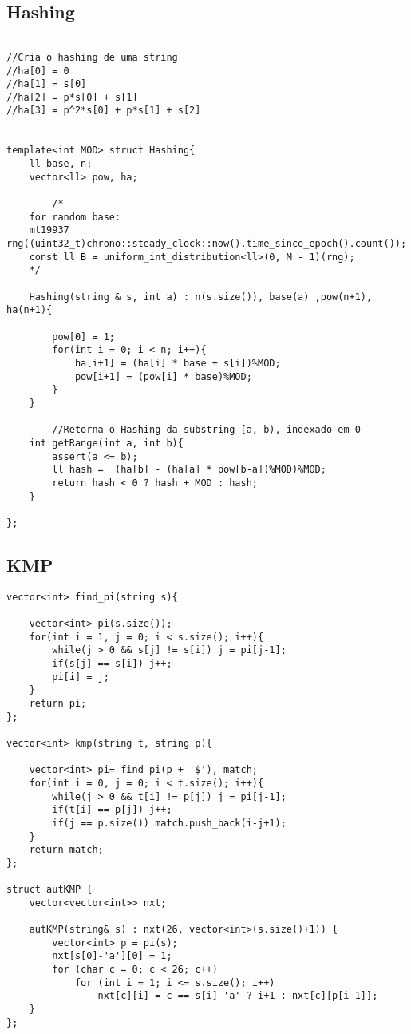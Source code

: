 \documentclass[11pt, a4paper, twoside]{article}
\begin{document}
\subsection{Hashing}
\begin{verbatim}

//Cria o hashing de uma string
//ha[0] = 0
//ha[1] = s[0]
//ha[2] = p*s[0] + s[1]
//ha[3] = p^2*s[0] + p*s[1] + s[2]


template<int MOD> struct Hashing{
    ll base, n;
    vector<ll> pow, ha; 
    
        /*
    for random base:
    mt19937 rng((uint32_t)chrono::steady_clock::now().time_since_epoch().count());
    const ll B = uniform_int_distribution<ll>(0, M - 1)(rng);
    */
    
    Hashing(string & s, int a) : n(s.size()), base(a) ,pow(n+1), ha(n+1){
    
        pow[0] = 1;
        for(int i = 0; i < n; i++){
            ha[i+1] = (ha[i] * base + s[i])%MOD;
            pow[i+1] = (pow[i] * base)%MOD;
        }
    }
        
        //Retorna o Hashing da substring [a, b), indexado em 0
    int getRange(int a, int b){
        assert(a <= b);
        ll hash =  (ha[b] - (ha[a] * pow[b-a])%MOD)%MOD;
        return hash < 0 ? hash + MOD : hash;
    }
        
};
\end{verbatim}

\subsection{KMP}
\begin{verbatim}
vector<int> find_pi(string s){
    
    vector<int> pi(s.size());
    for(int i = 1, j = 0; i < s.size(); i++){
        while(j > 0 && s[j] != s[i]) j = pi[j-1];
        if(s[j] == s[i]) j++;
        pi[i] = j;
    }
    return pi;
};

vector<int> kmp(string t, string p){
        
    vector<int> pi= find_pi(p + '$'), match;
    for(int i = 0, j = 0; i < t.size(); i++){
        while(j > 0 && t[i] != p[j]) j = pi[j-1];
        if(t[i] == p[j]) j++;
        if(j == p.size()) match.push_back(i-j+1);
    }
    return match;
};

struct autKMP {
    vector<vector<int>> nxt;
    
    autKMP(string& s) : nxt(26, vector<int>(s.size()+1)) {
        vector<int> p = pi(s);
        nxt[s[0]-'a'][0] = 1;
        for (char c = 0; c < 26; c++)
            for (int i = 1; i <= s.size(); i++)
                nxt[c][i] = c == s[i]-'a' ? i+1 : nxt[c][p[i-1]];
    }
};
\end{verbatim}
\end{document}
